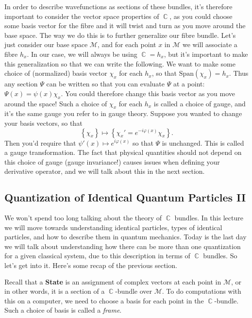 \documentclass{article}
\DeclareMathOperator{\CC}{\mathbb{C}}
\begin{document}
In order to describe wavefunctions as sections of these bundles, it's therefore important to consider the vector space properties of $\CC$, as you could choose some basis vector for the fibre and it will twist and turn as you move around the base space. The way we do this is to further generalize our fibre bundle. Let's just consider our base space $\mathcal{M}$, and for each point $x$ in $\mathcal{M}$ we will associate a fibre $h_x$. In our case, we will always be using $\CC = h_x$, but it's important to make this generalization so that we can write the following. We want to make some choice of (normalized) basis vector $\chi_x$ for each $h_x$, so that $\textrm{Span}(\chi_x) = h_x$. Thus any section $\Psi$ can be written so that you can evaluate $\Psi$ at a point: $\Psi(x) = \psi(x)\chi_x$. You could therefore change this basis vector as you move around the space! Such a choice of $\chi_x$ for each $h_x$ is called a choice of gauge, and it's the same gauge you refer to in gauge theory. Suppose you wanted to change your basis vectors, so that 
\[\left\{\chi_x \right\} \mapsto \left\{\chi_x'=e^{-i\varphi(x)}\chi_x\right\}.\] 
Then you'd require that $\psi'(x) \mapsto e^{i\varphi(x)}$ so that $\Psi$ is unchanged. This is called a gauge transformation. The fact that physical quantities should not depend on this choice of gauge (gauge invariance!) causes issues when defining your derivative operator, and we will talk about this in the next section.

\subsection{Quantization of Identical Quantum Particles II}
We won't spend too long talking about the theory of $\CC$ bundles. In this lecture we will move towards understanding identical particles, types of identical particles, and how to describe them in quantum mechanics. Today is the last day we will talk about understanding how there can be more than one quantization for a given classical system, due to this description in terms of $\CC$ bundles. So let's get into it. Here's some recap of the previous section.

Recall that a \textbf{State} is an assignment of complex vectors at each point in $\mathcal{M}$, or in other words, it is a section of a $\CC$-bundle over $\mathcal{M}$. To do computations with this on a computer, we need to choose a basis for each point in the $\CC$-bundle. Such a choice of basis is called a \textit{frame}.
\end{document}
